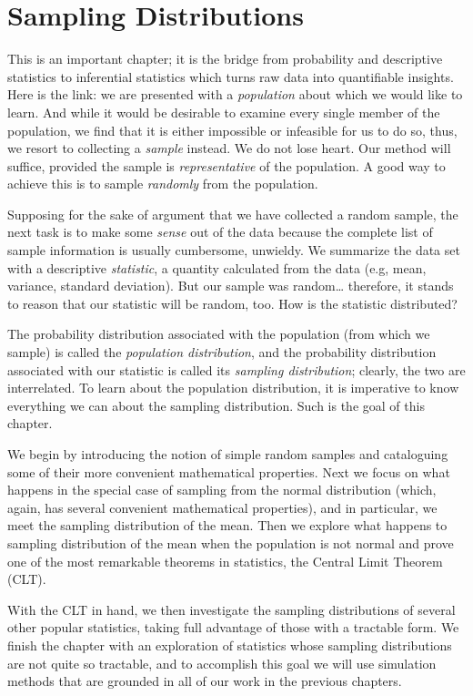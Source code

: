 \chapter{Sampling Distributions}
\label{sec-8}

\noindent
This is an important chapter; it is the bridge from probability and
descriptive statistics to inferential statistics which
turns raw data into quantifiable insights.
Here is the link: we are presented with a \emph{population} about which we
would like to learn. And while it would be desirable to examine every
single member of the population, we find that it is either impossible
or infeasible for us to do so, thus, we resort to collecting a
\emph{sample} instead. We do not lose heart. Our method will suffice,
provided the sample is \emph{representative} of the population. A good way
to achieve this is to sample \emph{randomly} from the population.

Supposing for the sake of argument that we have collected a random
sample, the next task is to make some \emph{sense} out of the data because
the complete list of sample information is usually cumbersome,
unwieldy. We summarize the data set with a descriptive \emph{statistic}, a
quantity calculated from the data (e.g, mean, variance, standard deviation).
But our sample was
random\ldots{} therefore, it stands to reason that our statistic will be
random, too. How is the statistic distributed?

The probability distribution associated with the population (from
which we sample) is called the \emph{population distribution}, and the
probability distribution associated with our statistic is called its
\emph{sampling distribution}; clearly, the two are interrelated. To learn
about the population distribution, it is imperative to know everything
we can about the sampling distribution. Such is the goal of this
chapter.

We begin by introducing the notion of simple random samples and
cataloguing some of their more convenient mathematical
properties. Next we focus on what happens in the special case of
sampling from the normal distribution (which, again, has several
convenient mathematical properties), and in particular, we meet the
sampling distribution of the mean.
Then we explore what happens to sampling distribution of the mean when
the population is not normal and prove one of the most remarkable
theorems in statistics, the Central Limit Theorem (CLT).

With the CLT in hand, we then investigate the sampling distributions
of several other popular statistics, taking full advantage of those
with a tractable form. We finish the chapter with an exploration of
statistics whose sampling distributions are not quite so tractable,
and to accomplish this goal we will use simulation methods that are
grounded in all of our work in the previous chapters.

